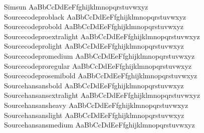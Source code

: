 \begin{tabbing}
Simsun \> { AaBbCcDdEeFfghijklmnopqrstuvwxyz} \\
Sourcecodeproblack \> { AaBbCcDdEeFfghijklmnopqrstuvwxyz} \\
Sourcecodeprobold \> { AaBbCcDdEeFfghijklmnopqrstuvwxyz} \\
Sourcecodeproextralight \> { AaBbCcDdEeFfghijklmnopqrstuvwxyz} \\
Sourcecodeprolight \> { AaBbCcDdEeFfghijklmnopqrstuvwxyz} \\
Sourcecodepromedium \> { AaBbCcDdEeFfghijklmnopqrstuvwxyz} \\
Sourcecodeproregular \> { AaBbCcDdEeFfghijklmnopqrstuvwxyz} \\
Sourcecodeprosemibold \> { AaBbCcDdEeFfghijklmnopqrstuvwxyz} \\
Sourcehansansbold \> { AaBbCcDdEeFfghijklmnopqrstuvwxyz} \\
Sourcehansansextralight \> { AaBbCcDdEeFfghijklmnopqrstuvwxyz} \\
Sourcehansansheavy \> { AaBbCcDdEeFfghijklmnopqrstuvwxyz} \\
Sourcehansanslight \> { AaBbCcDdEeFfghijklmnopqrstuvwxyz} \\
Sourcehansansmedium \> { AaBbCcDdEeFfghijklmnopqrstuvwxyz} \\

\end{tabbing}

